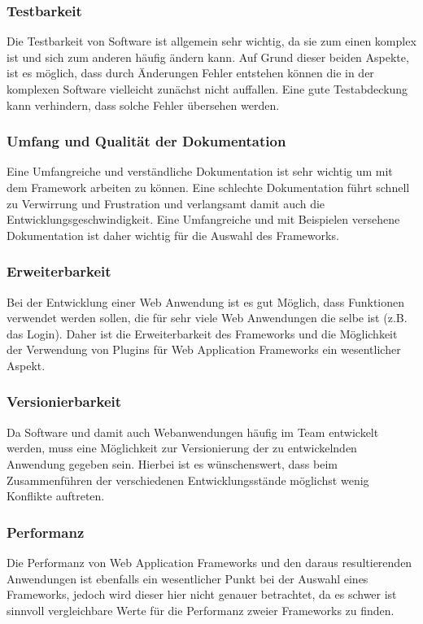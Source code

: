 \subsubsection*{Testbarkeit}
Die Testbarkeit von Software ist allgemein sehr wichtig, da sie zum einen komplex ist und sich zum anderen häufig ändern kann. Auf Grund dieser beiden Aspekte, ist es möglich, dass durch Änderungen Fehler entstehen können die in der komplexen Software vielleicht zunächst nicht auffallen. Eine gute Testabdeckung kann verhindern, dass solche Fehler übersehen werden.
\subsubsection*{Umfang und Qualität der Dokumentation}
Eine Umfangreiche und verständliche Dokumentation ist sehr wichtig um mit dem Framework arbeiten zu können. Eine schlechte Dokumentation führt schnell zu Verwirrung und Frustration und verlangsamt damit auch die Entwicklungsgeschwindigkeit. Eine Umfangreiche und mit Beispielen versehene Dokumentation ist daher wichtig für die Auswahl des Frameworks.
\subsubsection*{Erweiterbarkeit}
Bei der Entwicklung einer Web Anwendung ist es gut Möglich, dass Funktionen verwendet werden sollen, die für sehr viele Web Anwendungen die selbe ist (z.B. das Login). Daher ist die Erweiterbarkeit des Frameworks und die Möglichkeit der Verwendung von Plugins für Web Application Frameworks ein wesentlicher Aspekt.
\subsubsection*{Versionierbarkeit}
Da Software und damit auch Webanwendungen häufig im Team entwickelt werden, muss eine Möglichkeit zur Versionierung der zu entwickelnden Anwendung gegeben sein. Hierbei ist es wünschenswert, dass beim Zusammenführen der verschiedenen Entwicklungsstände möglichst wenig Konflikte auftreten.
\subsubsection*{Performanz}
Die Performanz von Web Application Frameworks und den daraus resultierenden Anwendungen ist ebenfalls ein wesentlicher Punkt bei der Auswahl eines Frameworks, jedoch wird dieser hier nicht genauer betrachtet, da es schwer ist sinnvoll vergleichbare Werte für die Performanz zweier Frameworks zu finden.
